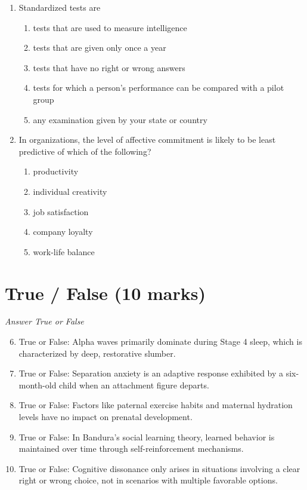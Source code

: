 \documentclass[12pt]{article}
\begin{document}
\begin{enumerate}[label=\arabic*.]
\begin{enumerate}[label=(\alph*)]
\end{enumerate}
\item Standardized tests are
\begin{enumerate}[label=(\alph*)]
    \item tests that are used to measure intelligence
    \item tests that are given only once a year
    \item tests that have no right or wrong answers
    \item tests for which a person's performance can be compared with a pilot group
    \item any examination given by your state or country
\end{enumerate}
\item In organizations, the level of affective commitment is likely to be least predictive of
which of the following?
\begin{enumerate}[label=(\alph*)]
    \item productivity
    \item individual creativity
    \item job satisfaction
    \item company loyalty
    \item work-life balance
\end{enumerate}
\end{enumerate}

\section*{True / False (10 marks)}
\textit{Answer True or False}
\begin{enumerate}[label=\arabic*.]
\setcounter{enumi}{5}
\item True or False: Alpha waves primarily dominate during Stage 4 sleep, which is characterized by deep, restorative slumber.
\item True or False: Separation anxiety is an adaptive response exhibited by a six-month-old child when an attachment figure departs.
\item True or False: Factors like paternal exercise habits and maternal hydration levels have no impact on prenatal development.
\item True or False: In Bandura's social learning theory, learned behavior is maintained over time through self-reinforcement mechanisms.
\item True or False: Cognitive dissonance only arises in situations involving a clear right or wrong choice, not in scenarios with multiple favorable options.
\end{enumerate}
\end{document}

